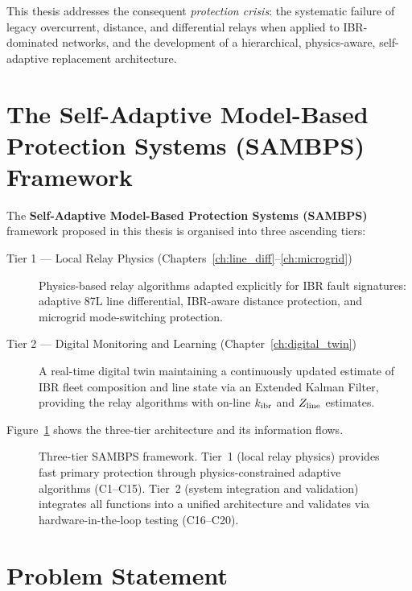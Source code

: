 This thesis addresses the consequent \emph{protection crisis}: the systematic
failure of legacy overcurrent, distance, and differential relays when
applied to IBR-dominated networks, and the development of a hierarchical,
physics-aware, self-adaptive replacement architecture.

\section{The Self-Adaptive Model-Based Protection Systems (SAMBPS) Framework}
\label{sec:ch1_sambp}

The \textbf{Self-Adaptive Model-Based Protection Systems (SAMBPS)} framework proposed
in this thesis is organised into three ascending tiers:

\begin{description}
\item[Tier 1 --- Local Relay Physics (Chapters~\ref{ch:line_diff}--\ref{ch:microgrid})]
  Physics-based relay algorithms adapted explicitly for IBR fault signatures:
  adaptive 87L line differential, IBR-aware distance protection, and microgrid
  mode-switching protection.

\item[Tier 2 --- Digital Monitoring and Learning (Chapter~\ref{ch:digital_twin})]
  A real-time digital twin maintaining a continuously updated estimate of
  IBR fleet composition and line state via an Extended Kalman Filter,
  providing the relay algorithms with on-line $k_{\mathrm{ibr}}$ and $Z_{\mathrm{line}}$ estimates.
\end{description}

Figure~\ref{fig:ch1_sambp_architecture} shows the three-tier architecture
and its information flows.

\begin{figure}[htbp]
  \centering
  
  \caption{Three-tier SAMBPS framework. Tier~1 (local relay physics) provides
           fast primary protection through physics-constrained adaptive
           algorithms (C1--C15). Tier~2 (system integration and validation)
           integrates all functions into a unified architecture and validates
           via hardware-in-the-loop testing (C16--C20).}
  \label{fig:ch1_sambp_architecture}
\end{figure}

\section{Problem Statement}
\label{sec:ch1_problem}

